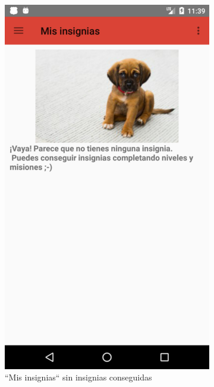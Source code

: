 \documentclass[twoside]{report}
\begin{document}
\begin{figure}[H]
\begin{center}
	\begin{subfigure}[t]{.3\linewidth}
		\includegraphics[scale=0.25]{images/userguide/7.png}
		\caption{“Mis insignias“ sin insignias conseguidas}
	\end{subfigure}\hspace{5mm}%
	\begin{subfigure}[t]{.3\linewidth}

\end{subfigure}
\end{center}
\end{figure}
\end{document}
